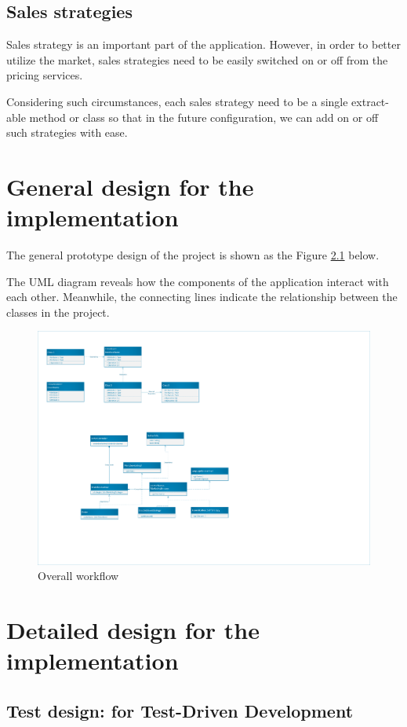 \documentclass[a4paper]{report}
\begin{document}
\section{Sales strategies}
Sales strategy is an important part of the application. However, in order to better utilize the market, sales strategies need to be easily switched on or off from the pricing services.
\par
Considering such circumstances, each sales strategy need to be a single extract-able method or class so that in the future configuration, we can add on or off such strategies with ease.


\chapter{General design for the implementation}
The general prototype design of the project is shown as the Figure \ref{2} below.
\par
The UML diagram reveals how the components of the application interact with each other. Meanwhile, the connecting lines indicate the relationship between the classes in the project.
\begin{figure}
  \centering
  \includegraphics[scale=0.52]{UML_Diagram.pdf}
  \caption{Overall workflow}\label{2}
\end{figure}


\chapter{Detailed design for the implementation}
\section{Test design: for Test-Driven Development}
\end{document}

